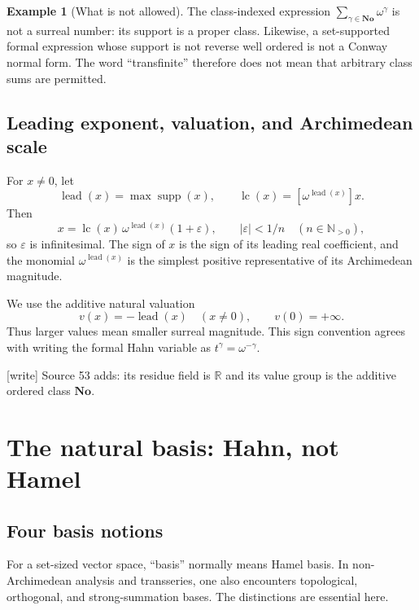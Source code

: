\documentclass[11pt,letterpaper]{article}
\numberwithin{equation}{section}
\theoremstyle{definition}
\newtheorem{example}[theorem]{Example}
\theoremstyle{remark}
\newcommand{\No}{\mathbf{No}}
\newcommand{\R}{\mathbb{R}}
\newcommand{\N}{\mathbb{N}}
\newcommand{\supp}{\operatorname{supp}}
\newcommand{\lead}{\operatorname{lead}}
\newcommand{\abs}[1]{\lvert #1\rvert}
\newcommand{\wtag}{\textup{[write]}}%
\begin{document}
\begin{example}[What is not allowed]
The class-indexed expression \(\sum_{\gamma\in\No}\omega^\gamma\) is not a
surreal number: its support is a proper class.  Likewise, a set-supported
formal expression whose support is not reverse well ordered is not a Conway
normal form.  The word ``transfinite'' therefore does not mean that arbitrary
class sums are permitted.
\end{example}

\subsection{Leading exponent, valuation, and Archimedean scale}

For \(x\ne0\), let
\[
 \lead(x)=\max\supp(x),
 \qquad
 \operatorname{lc}(x)=[\omega^{\lead(x)}]x.
\]
Then
\begin{equation}\label{rvs:eq:leading-factor}
 x=\operatorname{lc}(x)\,\omega^{\lead(x)}(1+\varepsilon),
 \qquad \abs{\varepsilon}<1/n\quad(n\in\N_{>0}),
\end{equation}
so \(\varepsilon\) is infinitesimal.  The sign of \(x\) is the sign of its
leading real coefficient, and the monomial \(\omega^{\lead(x)}\) is the
simplest positive representative of its Archimedean magnitude.

We use the additive natural valuation
\begin{equation}\label{rvs:eq:natural-valuation}
 v(x)=-\lead(x)\quad(x\ne0),\qquad v(0)=+\infty.
\end{equation}
Thus larger values mean smaller surreal magnitude.  This sign convention
agrees with writing the formal Hahn variable as \(t^\gamma=\omega^{-\gamma}\).

\noindent\wtag{} Source 53 adds: its residue field is \(\R\) and its value
group is the additive ordered class \(\No\).

\section{The natural basis: Hahn, not Hamel}\label{rvs:sec:natural-basis}
\label{rvs:cv:sec:bases}

\subsection{Four basis notions}

For a set-sized vector space, ``basis'' normally means Hamel basis.  In
non-Archimedean analysis and transseries, one also encounters topological,
orthogonal, and strong-summation bases.  The distinctions are essential here.
\end{document}
